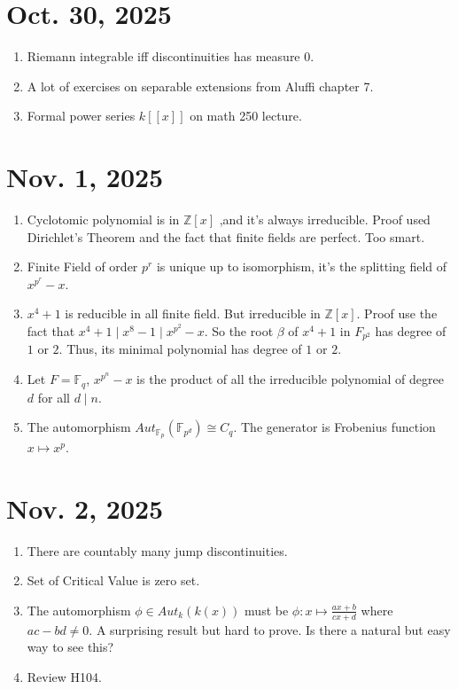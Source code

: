 \documentclass[15pt]{scrartcl}
\newcommand{\Z}{\mathbb{Z}}
\newcommand{\F}{\mathbb{F}}
\begin{document}
\section{Oct. 30, 2025}
\begin{enumerate}
\item Riemann integrable iff discontinuities has measure 0.
\item A lot of exercises on separable extensions from Aluffi chapter 7. 
\item Formal power series $k[[x]]$ on math 250 lecture. 
\end{enumerate}
\section{Nov. 1, 2025}
\begin{enumerate}
\item Cyclotomic polynomial is in $\Z[x]$ ,and it's always irreducible. Proof used Dirichlet's Theorem and the fact that finite fields are perfect. Too smart. 
\item Finite Field of order $p^r$ is unique up to isomorphism, it's the splitting field of $x^{p^r}-x$. 
\item $x^4+1$ is reducible in all finite field. But irreducible in $\Z[x]$. Proof use the fact that $x^4+1 \mid x^8-1\mid x^{p^2}-x$. So the root $\beta$ of $x^4+1$ in $F_{p^2}$ has degree of $1$ or $2$. Thus, its minimal polynomial has degree of $1$ or $2$.
\item Let $F=\F_q$, $x^{p^n}-x$ is the product of all the irreducible polynomial of degree $d$ for all $d\mid n$. 
\item The automorphism $Aut_{\F_p}(\F_{p^d})\cong C_q$. The generator is Frobenius function $x\mapsto x^p$. 
\end{enumerate}
\section{Nov. 2, 2025}
\begin{enumerate}
\item There are countably many jump discontinuities. 
\item Set of Critical Value is zero set. 
\item The automorphism $\phi\in Aut_k(k(x))$ must be $\phi: x\mapsto \frac{ax+b}{cx+d}$ where $ac-bd\not=0$. A surprising result but hard to prove. Is there a natural but easy way to see this?
\item Review H104. 
\end{enumerate}
\end{document}
